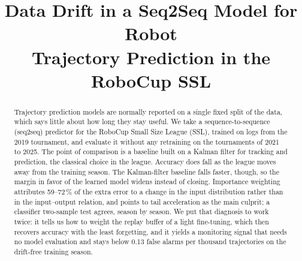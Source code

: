 \documentclass[conference]{IEEEtran}
\begin{document}
\title{Data Drift in a Seq2Seq Model for Robot\\Trajectory Prediction in the RoboCup SSL}

\author{
\and
{}
\and
{}
}

\maketitle

\begin{abstract}
Trajectory prediction models are normally reported on a single fixed split of
the data, which says little about how long they stay useful. We take a
sequence-to-sequence (seq2seq) predictor for the RoboCup Small Size League
(SSL), trained on logs from the 2019 tournament, and evaluate it without any
retraining on the tournaments of 2021 to 2025. The point of comparison is a
baseline built on a Kalman filter for tracking and prediction, the classical
choice in the league. Accuracy does fall as the league moves away from the
training season. The Kalman-filter baseline falls faster, though, so the margin
in favor of the learned model widens instead of closing. Importance weighting
attributes 59--72\,\% of the extra error to a change in the input distribution
rather than in the input--output relation, and points to tail acceleration as
the main culprit; a classifier two-sample test agrees, season by season. We put
that diagnosis to work twice: it tells us how to weight the replay buffer of a
light fine-tuning, which then recovers accuracy with the least forgetting, and
it yields a monitoring signal that needs no model evaluation and stays below
0.13 false alarms per thousand trajectories on the drift-free training season.
\end{abstract}
\end{document}
